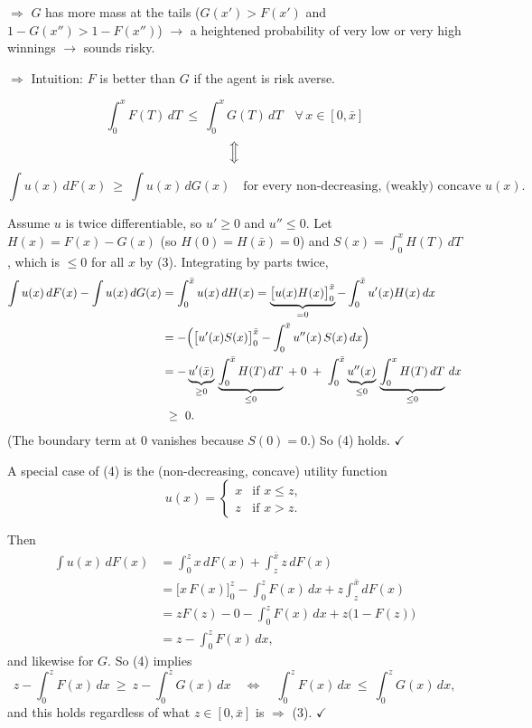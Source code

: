 \documentclass[11pt]{article}
\begin{document}
$\Rightarrow$ $G$ has more mass at the tails ($G(x')>F(x')$ and $1-G(x'')>1-F(x'')$)
$\to$ a heightened probability of very low or very high winnings $\to$ sounds risky.

$\Rightarrow$ Intuition: $F$ is better than $G$ if the agent is risk averse.

\[ \int_0^{x} F(T)\,dT\ \le\ \int_0^{x} G(T)\,dT \quad \forall\, x\in[0,\bar x] \tag{3} \]
\[ \Big\Updownarrow \]
\[ \int u(x)\,dF(x)\ \ge\ \int u(x)\,dG(x)
   \quad\text{for every non-decreasing, (weakly) concave } u(x). \tag{4} \]

Assume $u$ is twice differentiable, so $u'\ge0$ and $u''\le0$. Let $H(x)=F(x)-G(x)$
(so $H(0)=H(\bar x)=0$) and $S(x)=\int_0^{x}H(T)\,dT$, which is $\le0$ for all $x$ by (3).
Integrating by parts twice,
\begin{align*}
  \int u(x)\,dF(x)-\int u(x)\,dG(x)
   &= \int_0^{\bar x} u(x)\,dH(x)
    = \underbrace{\bigl[u(x)H(x)\bigr]_0^{\bar x}}_{=0}-\int_0^{\bar x} u'(x)H(x)\,dx\\
   &= -\Bigl(\bigl[u'(x)S(x)\bigr]_0^{\bar x}-\int_0^{\bar x} u''(x)\,S(x)\,dx\Bigr)\\
   &= -\underbrace{u'(\bar x)}_{\ge0}\,\underbrace{\int_0^{\bar x}H(T)\,dT}_{\le0}
      \;+\;0\;+\;\int_0^{\bar x}\underbrace{u''(x)}_{\le0}\,
      \underbrace{\int_0^{x}H(T)\,dT}_{\le0}\,dx\\
   &\ \ge\ 0.
\end{align*}
(The boundary term at $0$ vanishes because $S(0)=0$.) So (4) holds. $\checkmark$

A special case of (4) is the (non-decreasing, concave) utility function
\[ u(x)=\begin{cases} x & \text{if } x\le z,\\ z & \text{if } x>z. \end{cases} \]

\begin{center}
\end{center}

Then
\begin{align*}
  \int u(x)\,dF(x) &= \int_0^{z} x\,dF(x)+\int_z^{\bar x} z\,dF(x)\\
   &= \bigl[x\,F(x)\bigr]_0^{z}-\int_0^{z}F(x)\,dx + z\int_z^{\bar x}dF(x)\\
   &= zF(z)-0-\int_0^{z}F(x)\,dx+z\bigl(1-F(z)\bigr)\\
   &= z-\int_0^{z}F(x)\,dx,
\end{align*}
and likewise for $G$. So (4) implies
\[ z-\int_0^{z}F(x)\,dx\ \ge\ z-\int_0^{z}G(x)\,dx
   \quad\Longleftrightarrow\quad \int_0^{z}F(x)\,dx\ \le\ \int_0^{z}G(x)\,dx, \]
and this holds regardless of what $z\in[0,\bar x]$ is $\Rightarrow$ (3). $\checkmark$
\end{document}
